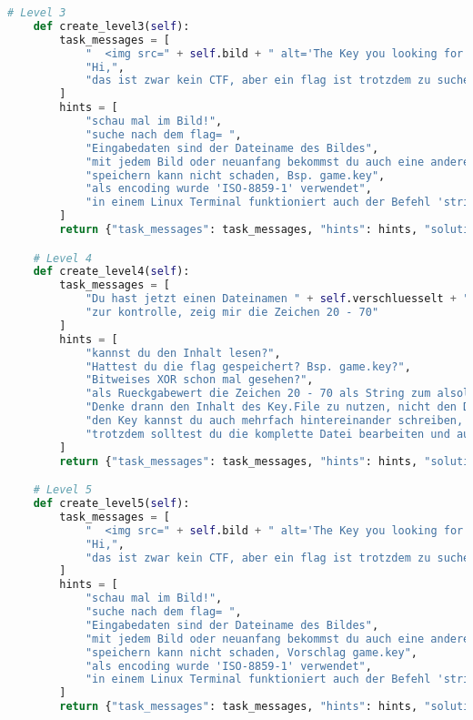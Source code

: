 \documentclass[a4paper 11pt]{article}
\begin{document}
\begin{lstlisting}[language=python, caption=Genereller Escape-Room]
    # Level 3
    def create_level3(self):
        task_messages = [
            "  <img src=" + self.bild + " alt='The Key you looking for' height='400'/> ",
            "Hi,",
			"das ist zwar kein CTF, aber ein flag ist trotzdem zu suchen",
        ]
        hints = [
            "schau mal im Bild!",
            "suche nach dem flag= ",
            "Eingabedaten sind der Dateiname des Bildes",
            "mit jedem Bild oder neuanfang bekommst du auch eine andere flag",
            "speichern kann nicht schaden, Bsp. game.key",
            "als encoding wurde 'ISO-8859-1' verwendet",
            "in einem Linux Terminal funktioniert auch der Befehl 'strings [Dateiname]' "
        ]
        return {"task_messages": task_messages, "hints": hints, "solution_function": STEGO.im_bild_finden, "data": self.bild}

    # Level 4
    def create_level4(self):
        task_messages = [
            "Du hast jetzt einen Dateinamen " + self.verschluesselt + ", schon mar reingeschaut?",
            "zur kontrolle, zeig mir die Zeichen 20 - 70"
        ]
        hints = [
            "kannst du den Inhalt lesen?",
            "Hattest du die flag gespeichert? Bsp. game.key?",
            "Bitweises XOR schon mal gesehen?",
            "als Rueckgabewert die Zeichen 20 - 70 als String zum alsolvieren dieses Level sollten erstmal reichen",
            "Denke drann den Inhalt des Key.File zu nutzen, nicht den Dateinamen",
            "den Key kannst du auch mehrfach hintereinander schreiben, falls er nicht lang genug ist",
            "trotzdem solltest du die komplette Datei bearbeiten und auch wieder speichern. Bsp. ausgabe_encrypt.txt"
        ]
        return {"task_messages": task_messages, "hints": hints, "solution_function": CRYPT.entschluesseln, "data": self.verschluesselt}

    # Level 5
    def create_level5(self):
        task_messages = [
            "  <img src=" + self.bild + " alt='The Key you looking for' height='200'/> ",
            "Hi,",
			"das ist zwar kein CTF, aber ein flag ist trotzdem zu suchen"
        ]
        hints = [
            "schau mal im Bild!",
            "suche nach dem flag= ",
            "Eingabedaten sind der Dateiname des Bildes",
            "mit jedem Bild oder neuanfang bekommst du auch eine andere flag",
            "speichern kann nicht schaden, Vorschlag game.key",
            "als encoding wurde 'ISO-8859-1' verwendet",
            "in einem Linux Terminal funktioniert auch der Befehl 'strings [Dateiname]' "
        ]
        return {"task_messages": task_messages, "hints": hints, "solution_function": STEGO.im_bild_finden, "data": self.bild}


\end{lstlisting}
\end{document}
